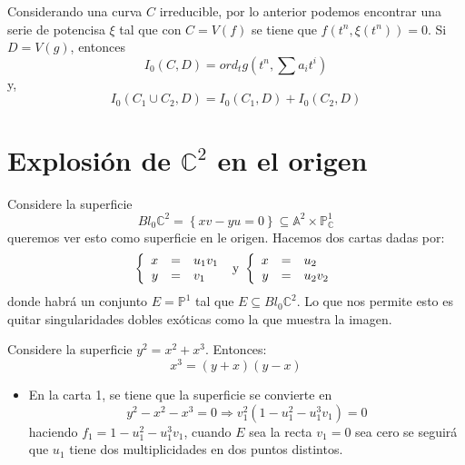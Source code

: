 \documentclass[12pt]{report}
\newcounter{it}
\theoremstyle{largebreak}
\begin{document}
    Considerando una curva $C$ irreducible, por lo anterior podemos encontrar una serie de potencisa $\xi$ tal que con $C=V(f)$ se tiene que $f(t^n,\xi(t^n))=0$. Si $D=V(g)$, entonces
    \begin{equation*}
        I_0(C,D)=ord_tg(t^n,\sum a_it^i)
    \end{equation*}
    y,
    \begin{equation*}
        I_0(C_1\cup C_2,D)=I_0(C_1,D)+I_0(C_2,D)
    \end{equation*}

    \section{Explosión de $\mathbb{C}^2$ en el origen}

    Considere la superficie
    \begin{equation*}
        Bl_0\mathbb{C}^2=\left\{xv-yu=0 \right\}\subseteq\mathbb{A}^2\times\mathbb{P}_{\mathbb{C}}^1
    \end{equation*}
    queremos ver esto como superficie en le origen. Hacemos dos cartas dadas por:
    \begin{equation*}
        \left\{ 
            \begin{array}{rcl}
                x & = & u_1v_1 \\
                y & = & v_1\\
            \end{array}
        \right.\textup{ y }\left\{ 
            \begin{array}{rcl}
                x & = & u_2 \\
                y & = & u_2v_2\\
            \end{array}
        \right.
    \end{equation*}
    donde habrá un conjunto $E=\mathbb{P}^1$ tal que $E\subseteq Bl_0\mathbb{C}^2$. Lo que nos permite esto es quitar singularidades dobles exóticas como la que muestra la imagen.

    Considere la superficie $y^2=x^2+x^3$. Entonces:
    \begin{equation*}
        x^3=(y+x)(y-x)
    \end{equation*}

    \begin{itemize}
        \item En la carta 1, se tiene que la superficie se convierte en
        \begin{equation*}
            y^2-x^2-x^3=0\Rightarrow v_1^2(1-u_1^2-u_1^3v_1)=0
        \end{equation*}
        haciendo $f_1=1-u_1^2-u_1^3v_1$, cuando $E$ sea la recta $v_1=0$ sea cero se seguirá que $u_1$ tiene dos multiplicidades en dos puntos distintos.
    \end{itemize}
\end{document}
